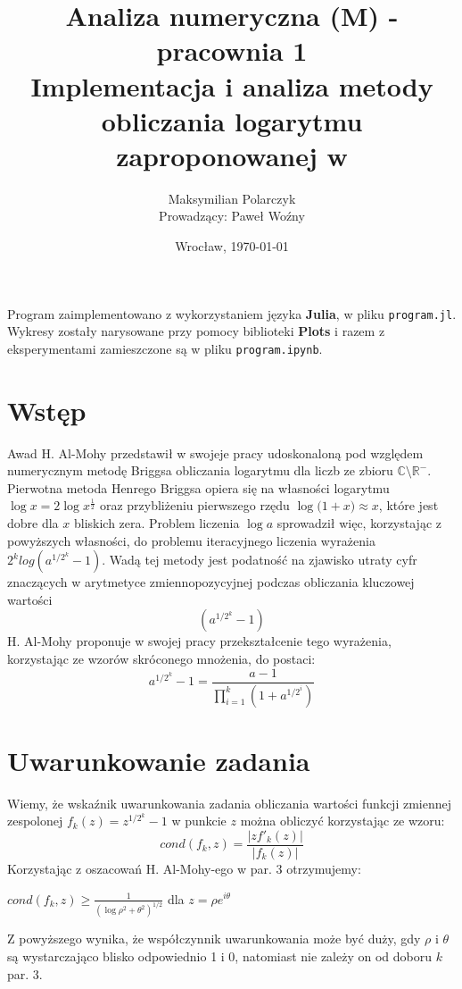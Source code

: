 \documentclass{article}
\begin{document}
\title{\textbf{Analiza numeryczna (M) - pracownia 1 }\\ 
Implementacja i analiza metody obliczania logarytmu zaproponowanej w \cite{al-mohy11}\\}
\date{Wrocław, \today}
\author{Maksymilian Polarczyk\\ Prowadzący: Paweł Woźny}
\maketitle
\noindent Program zaimplementowano z wykorzystaniem języka \textbf{Julia}, w pliku \texttt{program.jl}. Wykresy zostały narysowane przy pomocy biblioteki \textbf{Plots} i razem z eksperymentami zamieszczone są w pliku \texttt{program.ipynb}.

\section{Wstęp}

	Awad H. Al-Mohy przedstawił w swojeje pracy\cite{al-mohy11} udoskonaloną pod względem numerycznym metodę Briggsa obliczania logarytmu dla liczb ze zbioru $\mathbb{C}\setminus\mathbb{R}^-$. Pierwotna metoda Henrego Briggsa opiera się na własności logarytmu $\log{x}=2\log{x^\frac{1}{2}}$ oraz przybliżeniu pierwszego rzędu $\log({1+x)} \approx x$, które jest dobre dla $x$ bliskich zera. Problem liczenia $\log{a}$ sprowadził więc, korzystając z powyższych własności, do problemu iteracyjnego liczenia wyrażenia ${2^k}log{(a^{1/2^{k}}-1)}$. Wadą tej metody jest podatność na zjawisko utraty cyfr znaczących w arytmetyce zmiennopozycyjnej podczas obliczania kluczowej wartości \begin{equation} \label{eq:briggs}	(a^{1/2^{k}}-1) \end{equation} H. Al-Mohy proponuje w swojej pracy przekształcenie tego wyrażenia, korzystając ze wzorów skróconego mnożenia, do postaci:
\\ \begin{equation} \label{eq:al-mohy} a^{1/2^k}-1=\frac{a-1}{\prod_{i=1}^k (1+a^{1/2^i})} \end{equation}
\pagebreak

\section{Uwarunkowanie zadania}
	Wiemy, że wskaźnik uwarunkowania zadania obliczania wartości funkcji zmiennej zespolonej $f_{k}(z)=z^{1/2^k}-1$ w punkcie $z$ można obliczyć korzystając ze wzoru: \\
	\begin{equation} cond(f_{k}, z)=\frac{|zf'_{k}(z)|}{|f_{k}(z)|} \end{equation}
Korzystając z oszacowań H. Al-Mohy-ego w \cite{al-mohy11} par. 3 otrzymujemy:
\\ \begin{center} $cond(f_{k}, z) \geq \frac{1}{(\log{\rho}^2 + \theta^2)^{1/2}}$ dla $z=\rho e^{i\theta}$\end{center}
Z powyższego wynika, że współczynnik uwarunkowania może być duży, gdy $\rho$ i $\theta$ są wystarczająco blisko odpowiednio 1 i 0, natomiast nie zależy on od doboru $k$ \cite{al-mohy11} par. 3. 
\end{document}
